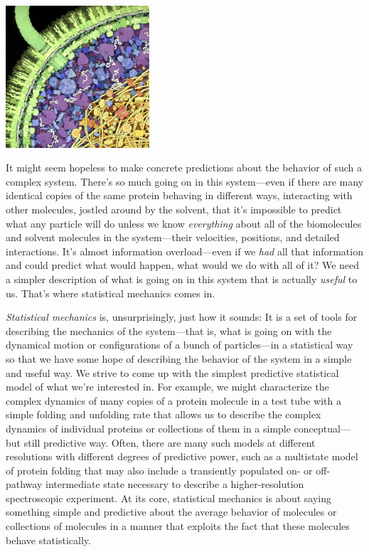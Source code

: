 \documentclass[english,course]{lecture}
\begin{document}
\begin{centering}
\includegraphics[width=0.4\textwidth]{figures/goodsell-ecoli-cytoplasm.jpg}

\end{centering}

It might seem hopeless to make concrete predictions about the behavior of such a complex system.
There's so much going on in this system---even if there are many identical copies of the same protein behaving in different ways, interacting with other molecules, jostled around by the solvent, that it's impossible to predict what any particle will do unless we know \emph{everything} about all of the biomolecules and solvent molecules in the system---their velocities, positions, and detailed interactions.
It's almost information overload---even if we \emph{had} all that information and could predict what would happen, what would we do with all of it?
We need a simpler description of what is going on in this system that is actually \emph{useful} to us.
That's where statistical mechanics comes in.


\emph{Statistical mechanics} is, unsurprisingly, just how it sounds: It is a set of tools for describing the mechanics of the system---that is, what is going on with the dynamical motion or configurations of a bunch of particles---in a statistical way so that we have some hope of describing the behavior of the system in a simple and useful way.
We strive to come up with the simplest predictive statistical model of what we're interested in.
For example, we might characterize the complex dynamics of many copies of a protein molecule in a test tube with a simple folding and unfolding rate that allows us to describe the complex dynamics of individual proteins or collections of them in a simple conceptual---but still predictive way.
Often, there are many such models at different resolutions with different degrees of predictive power, such as a multistate model of protein folding that may also include a transiently populated on- or off-pathway intermediate state necessary to describe a higher-resolution spectroscopic experiment.
At its core, statistical mechanics is about saying something simple and predictive about the average behavior of molecules or collections of molecules in a manner that exploits the fact that these molecules behave statistically.
\end{document}
